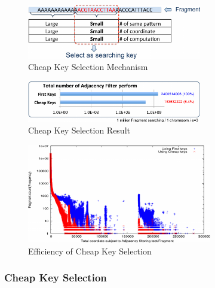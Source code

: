 \begin{figure}[h] \centering \vspace{0.1in}
\includegraphics[width=3.0in]{./figure/Cheap_Key_B.pdf} \vspace{0in}
\caption{Cheap Key Selection Mechanism} 
\label{fig:cheap_key} 
\end{figure}
\begin{figure}[b] \centering \vspace{0.1in}
\includegraphics[width=3.0in]{./figure/CK_Result_B.pdf} \vspace{0in}
\caption{Cheap Key Selection Result} 
\label{fig:ck_result} 
\end{figure}
\begin{figure}[t] \centering \vspace{0.1in}
\includegraphics[height=1.7in]{./figure/Key_Dist2_B.pdf} \vspace{0in}
\caption{Efficiency of Cheap Key Selection} 
\label{fig:key_dist2} 
\end{figure}

\subsubsection{Cheap Key Selection} 

